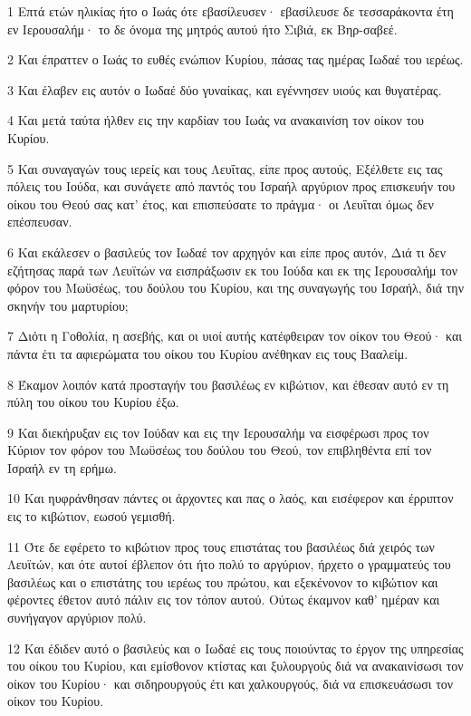 \par 1 Επτά ετών ηλικίας ήτο ο Ιωάς ότε εβασίλευσεν· εβασίλευσε δε τεσσαράκοντα έτη εν Ιερουσαλήμ· το δε όνομα της μητρός αυτού ήτο Σιβιά, εκ Βηρ-σαβεέ.
\par 2 Και έπραττεν ο Ιωάς το ευθές ενώπιον Κυρίου, πάσας τας ημέρας Ιωδαέ του ιερέως.
\par 3 Και έλαβεν εις αυτόν ο Ιωδαέ δύο γυναίκας, και εγέννησεν υιούς και θυγατέρας.
\par 4 Και μετά ταύτα ήλθεν εις την καρδίαν του Ιωάς να ανακαινίση τον οίκον του Κυρίου.
\par 5 Και συναγαγών τους ιερείς και τους Λευΐτας, είπε προς αυτούς, Εξέλθετε εις τας πόλεις του Ιούδα, και συνάγετε από παντός του Ισραήλ αργύριον προς επισκευήν του οίκου του Θεού σας κατ' έτος, και επισπεύσατε το πράγμα· οι Λευΐται όμως δεν επέσπευσαν.
\par 6 Και εκάλεσεν ο βασιλεύς τον Ιωδαέ τον αρχηγόν και είπε προς αυτόν, Διά τι δεν εζήτησας παρά των Λευϊτών να εισπράξωσιν εκ του Ιούδα και εκ της Ιερουσαλήμ τον φόρον του Μωϋσέως, του δούλου του Κυρίου, και της συναγωγής του Ισραήλ, διά την σκηνήν του μαρτυρίου;
\par 7 Διότι η Γοθολία, η ασεβής, και οι υιοί αυτής κατέφθειραν τον οίκον του Θεού· και πάντα έτι τα αφιερώματα του οίκου του Κυρίου ανέθηκαν εις τους Βααλείμ.
\par 8 Έκαμον λοιπόν κατά προσταγήν του βασιλέως εν κιβώτιον, και έθεσαν αυτό εν τη πύλη του οίκου του Κυρίου έξω.
\par 9 Και διεκήρυξαν εις τον Ιούδαν και εις την Ιερουσαλήμ να εισφέρωσι προς τον Κύριον τον φόρον του Μωϋσέως του δούλου του Θεού, τον επιβληθέντα επί τον Ισραήλ εν τη ερήμω.
\par 10 Και ηυφράνθησαν πάντες οι άρχοντες και πας ο λαός, και εισέφερον και έρριπτον εις το κιβώτιον, εωσού γεμισθή.
\par 11 Ότε δε εφέρετο το κιβώτιον προς τους επιστάτας του βασιλέως διά χειρός των Λευϊτών, και ότε αυτοί έβλεπον ότι ήτο πολύ το αργύριον, ήρχετο ο γραμματεύς του βασιλέως και ο επιστάτης του ιερέως του πρώτου, και εξεκένονον το κιβώτιον και φέροντες έθετον αυτό πάλιν εις τον τόπον αυτού. Ούτως έκαμνον καθ' ημέραν και συνήγαγον αργύριον πολύ.
\par 12 Και έδιδεν αυτό ο βασιλεύς και ο Ιωδαέ εις τους ποιούντας το έργον της υπηρεσίας του οίκου του Κυρίου, και εμίσθονον κτίστας και ξυλουργούς διά να ανακαινίσωσι τον οίκον του Κυρίου· και σιδηρουργούς έτι και χαλκουργούς, διά να επισκευάσωσι τον οίκον του Κυρίου.
